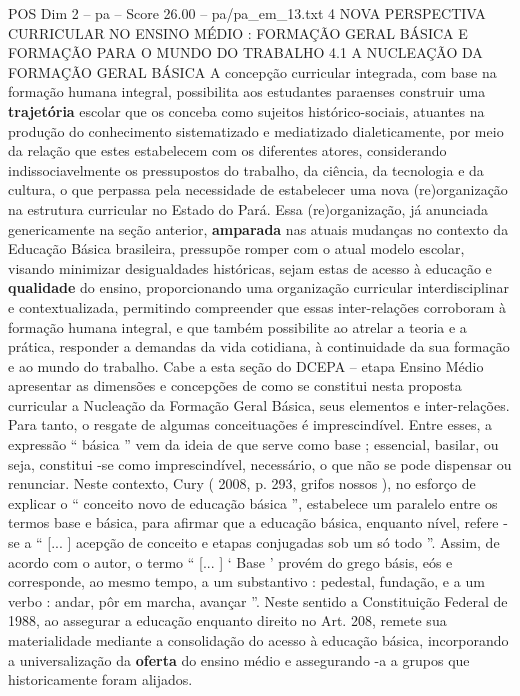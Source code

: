 \begin{textsample}{POS Dim 2 – pa – Score 26.00 – pa/pa\_em\_13.txt}  \label{ex:f2_pos_067}
4 NOVA PERSPECTIVA CURRICULAR NO ENSINO MÉDIO : FORMAÇÃO GERAL BÁSICA E FORMAÇÃO PARA O MUNDO DO TRABALHO 4.1 A NUCLEAÇÃO DA FORMAÇÃO GERAL BÁSICA A concepção curricular integrada, com base na formação humana integral, possibilita aos estudantes paraenses construir uma \textbf{trajetória} escolar que os conceba como sujeitos histórico-sociais, atuantes na produção do conhecimento sistematizado e mediatizado dialeticamente, por meio da relação que estes estabelecem com os diferentes atores, considerando indissociavelmente os pressupostos do trabalho, da ciência, da tecnologia e da cultura, o que perpassa pela necessidade de estabelecer uma nova (re)organização na estrutura curricular no Estado do Pará.
Essa (re)organização, já anunciada genericamente na seção anterior, \textbf{amparada} nas atuais mudanças no contexto da Educação Básica brasileira, pressupõe romper com o atual modelo escolar, visando minimizar desigualdades históricas, sejam estas de acesso à educação e \textbf{qualidade} do ensino, proporcionando uma organização curricular interdisciplinar e contextualizada, permitindo compreender que essas inter-relações corroboram à formação humana integral, e que também possibilite ao atrelar a teoria e a prática, responder a demandas da vida cotidiana, à continuidade da sua formação e ao mundo do trabalho.
Cabe a esta seção do DCEPA – etapa Ensino Médio apresentar as dimensões e concepções de como se constitui nesta proposta curricular a Nucleação da Formação Geral Básica, seus elementos e inter-relações.
Para tanto, o resgate de algumas conceituações é imprescindível.
Entre esses, a expressão “ básica ” vem da ideia de que serve como base ; essencial, basilar, ou seja, constitui -se como imprescindível, necessário, o que não se pode dispensar ou renunciar.
Neste contexto, Cury ( 2008, p. 293, grifos nossos ), no esforço de explicar o “ conceito novo de educação básica ”, estabelece um paralelo entre os termos base e básica, para afirmar que a educação básica, enquanto nível, refere -se a “ [... ] acepção de conceito e etapas conjugadas sob um só todo ”.
Assim, de acordo com o autor, o termo “ [... ] ‘ Base ’ provém do grego básis, eós e corresponde, ao mesmo tempo, a um substantivo : pedestal, fundação, e a um verbo : andar, pôr em marcha, avançar ”.
Neste sentido a Constituição Federal de 1988, ao assegurar a educação enquanto direito no Art. 208, remete sua materialidade mediante a consolidação do acesso à educação básica, incorporando a universalização da \textbf{oferta} do ensino médio e assegurando -a a grupos que historicamente foram alijados.

\end{textsample}
